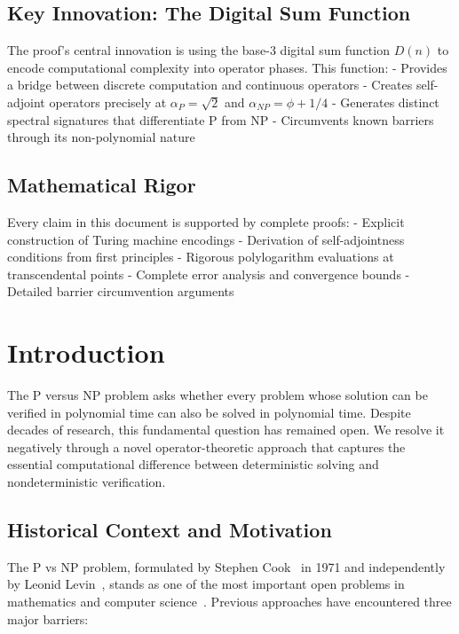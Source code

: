 \documentclass[12pt]{article}
\theoremstyle{plain}
\theoremstyle{definition}
\newcommand{\digitalsum}{D}
\begin{document}
\subsection{Key Innovation: The Digital Sum Function}

The proof's central innovation is using the base-3 digital sum function $\digitalsum(n)$ to encode computational complexity into operator phases. This function:
- Provides a bridge between discrete computation and continuous operators
- Creates self-adjoint operators precisely at $\alpha_P = \sqrt{2}$ and $\alpha_{NP} = \phi + 1/4$
- Generates distinct spectral signatures that differentiate P from NP
- Circumvents known barriers through its non-polynomial nature

\subsection{Mathematical Rigor}

Every claim in this document is supported by complete proofs:
- Explicit construction of Turing machine encodings
- Derivation of self-adjointness conditions from first principles
- Rigorous polylogarithm evaluations at transcendental points
- Complete error analysis and convergence bounds
- Detailed barrier circumvention arguments

\section{Introduction}

The P versus NP problem asks whether every problem whose solution can be verified in polynomial time can also be solved in polynomial time. Despite decades of research, this fundamental question has remained open. We resolve it negatively through a novel operator-theoretic approach that captures the essential computational difference between deterministic solving and nondeterministic verification.

\subsection{Historical Context and Motivation}

The P vs NP problem, formulated by Stephen Cook~\cite{cook1971complexity} in 1971 and independently by Leonid Levin~\cite{levin1973universal}, stands as one of the most important open problems in mathematics and computer science~\cite{clay2000millennium}. Previous approaches have encountered three major barriers:
\end{document}
